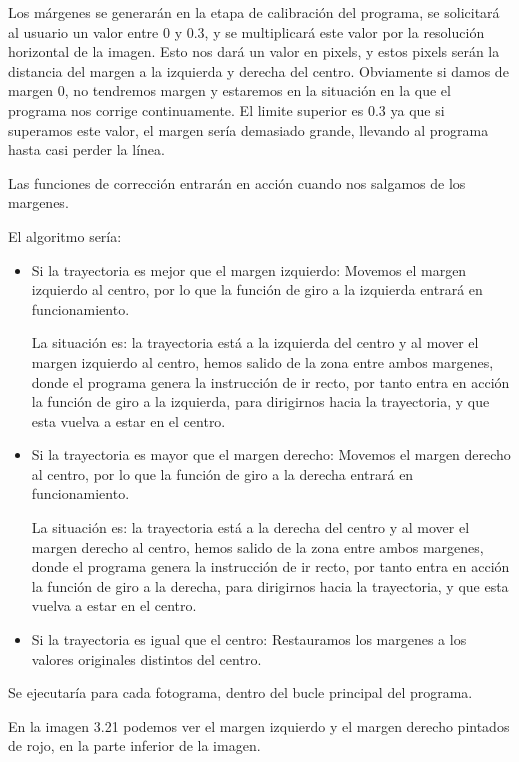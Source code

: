Los márgenes se generarán en la etapa de calibración del programa, se solicitará al usuario un valor entre 0 y 0.3, y se multiplicará este valor por la resolución horizontal de la imagen. Esto nos dará un valor en pixels, y estos pixels serán la distancia del margen a la izquierda y derecha del centro. Obviamente si damos de margen 0, no tendremos margen y estaremos en la situación en la que el programa nos corrige continuamente. El limite superior es 0.3 ya que si superamos este valor, el margen sería demasiado grande, llevando al programa hasta casi perder la línea. 

Las funciones de corrección entrarán en acción cuando nos salgamos de los margenes. 

El algoritmo sería:

\begin{itemize}
	\item Si la trayectoria es mejor que el margen izquierdo:
	Movemos el margen izquierdo al centro, por lo que la función de giro a la izquierda entrará en funcionamiento. 
	
	La situación es: la trayectoria está a la izquierda del centro y al mover el margen izquierdo al centro, hemos salido de la zona entre ambos margenes, donde el programa genera la instrucción de ir recto, por tanto entra en acción la función de giro a la izquierda, para dirigirnos hacia la trayectoria, y que esta vuelva a estar en el centro.
	
	\item Si la trayectoria es mayor que el margen derecho:
	Movemos el margen derecho al centro, por lo que la función de giro a la derecha entrará en funcionamiento. 
	
	La situación es: la trayectoria está a la derecha del centro y al mover el margen derecho al centro, hemos salido de la zona entre ambos margenes, donde el programa genera la instrucción de ir recto, por tanto entra en acción la función de giro a la derecha, para dirigirnos hacia la trayectoria, y que esta vuelva a estar en el centro.
	
	\item Si la trayectoria es igual que el centro:
	Restauramos los margenes a los valores originales distintos del centro.
	
\end{itemize}

Se ejecutaría para cada fotograma, dentro del bucle principal del programa.

En la imagen 3.21 podemos ver el margen izquierdo y el margen derecho pintados de rojo, en la parte inferior de la imagen.

